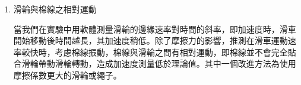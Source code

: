 \documentclass[11pt,a4paper]{article}
\theoremstyle{definition}
\begin{document}
\begin{enumerate}
                雖然滑車和軌道之間為純滾動的輪子而非接觸面，此推導仍可能有適性，因為輪軸和輪子之間的正向力正比於滑車和軌道之間的正向力。
                \par
                根據以上推導，使用此模型會造成加速度固定之負偏差，重新分析實驗B加速度$a$對拉力$F$作圖回歸直線：

                \begin{equation}
                    a = \SI{1.86}{\per\kilogram} \times F - \SI{0.0139}{\meter\per\second\squared}
                \end{equation}

                其中$M$ = \SI{0.5345}{\kilogram}。先由截距理論值

                \begin{equation}
                    \frac{(M - m_{eff})g\mu}{m_1 + m_2 + m_{eff}}
                \end{equation}

                得出摩擦係數 $\mu$ = 0.00143。雖然看似略小，但實際上摩擦係數由輪子貢獻，其輪軸經過潤滑，摩擦係數本就應該不大。接著我們使用計算校正後之斜率，由質量理論值搭配算出的摩擦係數計算斜率理論值：

                \begin{equation}
                    \frac{1 + 0.00143}{\SI{0.5345}{\kilogram}} = \SI{1.874}{\per\kilogram}
                \end{equation}

                並和回歸直線斜率之斜率比較

                \begin{equation}
                    \left| \frac{1.86 - 1.870}{1.870} \right| \times 100\% = 0.747\%
                \end{equation}

                故此模型可以解釋實驗B\ \autoref{fig:實驗B數據圖}截距小於0，卻沒有成功解釋斜率的負偏差。
                \par
                前述提到因輪子和滑輪基本上為純滾動，推測摩擦力主要來源為輪軸，而輪軸上有潤滑油，因此摩擦力會包含和速度的正數次方成正比的項，即摩擦力和加速度有正相關。可以解釋實驗A\ \autoref{fig:實驗A數據圖}、實驗B\ \autoref{fig:實驗B數據圖}的斜率小於理論值。
                \par
                另外，在滑車移動的同時，可能輪子可能擦到軌道，造成摩擦力。因此我們在實驗前皆有經過水平儀確認滑車移動時沒有側面方向的傾斜，以降低這種影響。

                \item 滑輪與棉線之相對運動
                \par
                當我們在實驗中用軟體測量滑輪的邊緣速率對時間的斜率，即加速度時，滑車開始移動後時間越長，其加速度稍低。除了摩擦力的影響，推測在滑車運動速率較快時，考慮棉線振動，棉線與滑輪之間有相對運動，即棉線並不會完全貼合滑輪帶動滑輪轉動，造成加速度測量低於理論值。其中一個改進方法為使用摩擦係數更大的滑輪或繩子。
                
            \end{enumerate}
\end{document}
